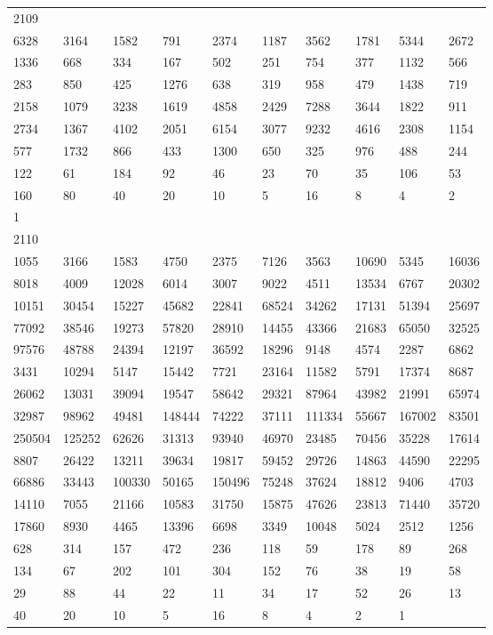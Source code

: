 \begin{longtable}{*{10}{l}}
2109&&&&&&&&&\\
6328& 3164& 1582& 791& 2374& 1187& 3562& 1781& 5344& 2672\\
1336& 668& 334& 167& 502& 251& 754& 377& 1132& 566\\
283& 850& 425& 1276& 638& 319& 958& 479& 1438& 719\\
2158& 1079& 3238& 1619& 4858& 2429& 7288& 3644& 1822& 911\\
2734& 1367& 4102& 2051& 6154& 3077& 9232& 4616& 2308& 1154\\
577& 1732& 866& 433& 1300& 650& 325& 976& 488& 244\\
122& 61& 184& 92& 46& 23& 70& 35& 106& 53\\
160& 80& 40& 20& 10& 5& 16& 8& 4& 2\\
1& \\

2110&&&&&&&&&\\
1055& 3166& 1583& 4750& 2375& 7126& 3563& 10690& 5345& 16036\\
8018& 4009& 12028& 6014& 3007& 9022& 4511& 13534& 6767& 20302\\
10151& 30454& 15227& 45682& 22841& 68524& 34262& 17131& 51394& 25697\\
77092& 38546& 19273& 57820& 28910& 14455& 43366& 21683& 65050& 32525\\
97576& 48788& 24394& 12197& 36592& 18296& 9148& 4574& 2287& 6862\\
3431& 10294& 5147& 15442& 7721& 23164& 11582& 5791& 17374& 8687\\
26062& 13031& 39094& 19547& 58642& 29321& 87964& 43982& 21991& 65974\\
32987& 98962& 49481& 148444& 74222& 37111& 111334& 55667& 167002& 83501\\
250504& 125252& 62626& 31313& 93940& 46970& 23485& 70456& 35228& 17614\\
8807& 26422& 13211& 39634& 19817& 59452& 29726& 14863& 44590& 22295\\
66886& 33443& 100330& 50165& 150496& 75248& 37624& 18812& 9406& 4703\\
14110& 7055& 21166& 10583& 31750& 15875& 47626& 23813& 71440& 35720\\
17860& 8930& 4465& 13396& 6698& 3349& 10048& 5024& 2512& 1256\\
628& 314& 157& 472& 236& 118& 59& 178& 89& 268\\
134& 67& 202& 101& 304& 152& 76& 38& 19& 58\\
29& 88& 44& 22& 11& 34& 17& 52& 26& 13\\
40& 20& 10& 5& 16& 8& 4& 2& 1& \\


\end{longtable}
